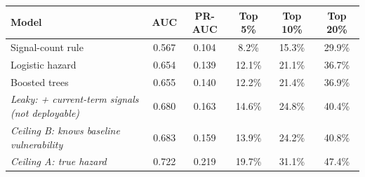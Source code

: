 \setlength{\tabcolsep}{5pt}\begin{tabular}{@{}lccccc@{}}\toprule
Model & AUC & PR-AUC & Top 5\% & Top 10\% & Top 20\% \\
\midrule
Signal-count rule & 0.567 & 0.104 & 8.2\% & 15.3\% & 29.9\% \\
Logistic hazard & 0.654 & 0.139 & 12.1\% & 21.1\% & 36.7\% \\
Boosted trees & 0.655 & 0.140 & 12.2\% & 21.4\% & 36.9\% \\
\midrule
\textit{Leaky: + current-term signals (not deployable)} & 0.680 & 0.163 & 14.6\% & 24.8\% & 40.4\% \\
\textit{Ceiling B: knows baseline vulnerability} & 0.683 & 0.159 & 13.9\% & 24.2\% & 40.8\% \\
\textit{Ceiling A: true hazard} & 0.722 & 0.219 & 19.7\% & 31.1\% & 47.4\% \\
\bottomrule
\end{tabular}
